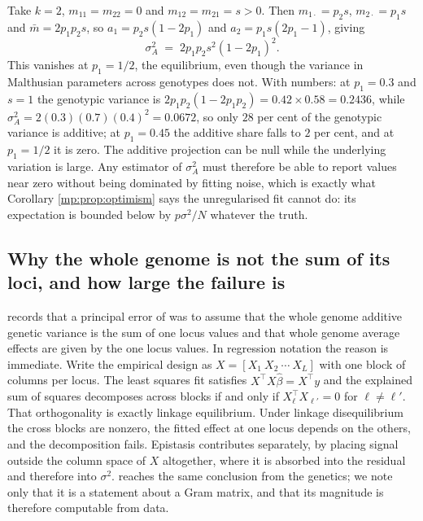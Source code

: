 \begin{example}[Overdominance]
\label{mp:ex:over}
Take $k=2$, $m_{11}=m_{22}=0$ and $m_{12}=m_{21}=s>0$. Then $m_{1\cdot}=p_2s$,
$m_{2\cdot}=p_1s$ and $\bar m=2p_1p_2s$, so $a_1=p_2s(1-2p_1)$ and $a_2=p_1s(2p_1-1)$,
giving
\[
\sigma_A^2 \;=\; 2p_1p_2s^2(1-2p_1)^2 .
\]
This vanishes at $p_1=1/2$, the equilibrium, even though the variance in Malthusian
parameters across genotypes does not. With numbers: at $p_1=0.3$ and $s=1$ the genotypic
variance is $2p_1p_2(1-2p_1p_2)=0.42\times0.58=0.2436$, while
$\sigma_A^2=2(0.3)(0.7)(0.4)^2=0.0672$, so only $28$ per cent of the genotypic variance is
additive; at $p_1=0.45$ the additive share falls to $2$ per cent, and at $p_1=1/2$ it is zero. The additive projection can be null while the
underlying variation is large. Any estimator of $\sigma_A^2$ must therefore be able to
report values near zero without being dominated by fitting noise, which is exactly what
Corollary \ref{mp:prop:optimism} says the unregularised fit cannot do: its expectation is
bounded below by $p\sigma^2/N$ whatever the truth.
\end{example}

\subsection{Why the whole genome is not the sum of its loci, and how large the failure is}

\citet{mp:ewens2024} records that a principal error of \citet{mp:fisher1930} was to assume that the
whole genome additive genetic variance is the sum of one locus values and that whole genome
average effects are given by the one locus values. In regression notation the reason is
immediate. Write the empirical design as $X=[X_1\ X_2\ \cdots\ X_L]$ with one block of
columns per locus. The least squares fit satisfies $X^\top X\hat\beta=X^\top y$ and the
explained sum of squares decomposes across blocks if and only if $X_\ell^\top X_{\ell'}=0$
for $\ell\ne\ell'$. That orthogonality is exactly linkage equilibrium. Under linkage
disequilibrium the cross blocks are nonzero, the fitted effect at one locus depends on the
others, and the decomposition fails. Epistasis contributes separately, by placing signal
outside the column space of $X$ altogether, where it is absorbed into the residual and
therefore into $\sigma^2$. \citet{mp:ewens2024} reaches the same conclusion from the genetics; we
note only that it is a statement about a Gram matrix, and that its magnitude is therefore
computable from data.

